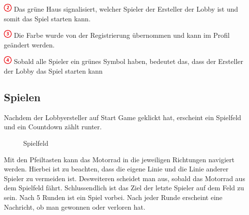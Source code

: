 \documentclass[11pt,ngerman]{article}
\begin{document}
    \includegraphics{figures/2.png} Das grüne Haus signalisiert, welcher Spieler der Ersteller der Lobby ist und somit das Spiel starten kann.
    
    \includegraphics{figures/3.png} Die Farbe wurde von der Registrierung übernommen und kann im Profil geändert werden.
    
    \includegraphics{figures/4.png} Sobald alle Spieler ein grünes Symbol haben, bedeutet das, dass der Ersteller der Lobby das Spiel starten kann
    
    \subsection{Spielen}
    
    Nachdem der Lobbyersteller auf Start Game geklickt hat, erscheint ein Spielfeld und ein Countdown zählt runter.
    
    \begin{figure}[H]
    	\centering
    	\caption{Spielfeld}
    	\label{fig:Spielfeld}
    \end{figure}
    
    Mit den Pfeiltasten kann das Motorrad in die jeweiligen Richtungen navigiert werden. 
    Hierbei ist zu beachten, dass die eigene Linie und die Linie anderer Spieler zu vermeiden ist. Desweiteren scheidet man aus, sobald das Motorrad aus dem Spielfeld fährt. 
    Schlussendlich ist das Ziel der letzte Spieler auf dem Feld zu sein. Nach 5 Runden ist ein Spiel vorbei. Nach jeder Runde erscheint eine Nachricht, ob man gewonnen oder verloren hat.
   
    
\end{document}
